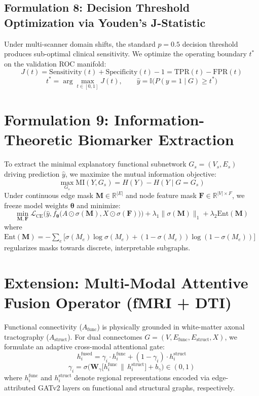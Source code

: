 \documentclass[11pt,a4paper]{article}
\begin{document}
\subsection{Formulation 8: Decision Threshold Optimization via Youden's J-Statistic}
Under multi-scanner domain shifts, the standard $p = 0.5$ decision threshold produces sub-optimal clinical sensitivity. We optimize the operating boundary $t^*$ on the validation ROC manifold:
\begin{equation}
J(t) = \text{Sensitivity}(t) + \text{Specificity}(t) - 1 = \text{TPR}(t) - \text{FPR}(t)
\end{equation}
\begin{equation}
t^* = \arg\max_{t \in [0, 1]} J(t), \qquad \hat{y} = \mathbb{I}\Big( P(y = 1 \mid G) \ge t^* \Big)
\end{equation}

\section{Formulation 9: Information-Theoretic Biomarker Extraction}
To extract the minimal explanatory functional subnetwork $G_s = (V_s, E_s)$ driving prediction $\hat{y}$, we maximize the mutual information objective:
\begin{equation}
\max_{G_s} \text{MI}(Y, G_s) = H(Y) - H(Y \mid G = G_s)
\end{equation}
Under continuous edge mask $\bm{M} \in \mathbb{R}^{|E|}$ and node feature mask $\bm{F} \in \mathbb{R}^{|V| \times F}$, we freeze model weights $\bm{\theta}$ and minimize:
\begin{equation}
\min_{\bm{M}, \bm{F}} \mathcal{L}_{\text{CE}}\Big( \hat{y}, f_{\bm{\theta}}\big( A \odot \sigma(\bm{M}), X \odot \sigma(\bm{F}) \big) \Big) + \lambda_1 \|\sigma(\bm{M})\|_1 + \lambda_2 \text{Ent}(\bm{M})
\end{equation}
where $\text{Ent}(\bm{M}) = -\sum_{e} \big[ \sigma(M_e) \log \sigma(M_e) + (1 - \sigma(M_e)) \log (1 - \sigma(M_e)) \big]$ regularizes masks towards discrete, interpretable subgraphs.

\section{Extension: Multi-Modal Attentive Fusion Operator (fMRI + DTI)}
Functional connectivity ($A_{\text{func}}$) is physically grounded in white-matter axonal tractography ($A_{\text{struct}}$). For dual connectomes $G = (V, E_{\text{func}}, E_{\text{struct}}, X)$, we formulate an adaptive cross-modal attentional gate:
\begin{equation}
h_i^{\text{fused}} = \gamma_i \cdot h_i^{\text{func}} + (1 - \gamma_i) \cdot h_i^{\text{struct}}
\end{equation}
\begin{equation}
\gamma_i = \sigma\Big( \bm{W}_\gamma \big[ h_i^{\text{func}} \,\|\, h_i^{\text{struct}} \big] + b_\gamma \Big) \in (0, 1)
\end{equation}
where $h_i^{\text{func}}$ and $h_i^{\text{struct}}$ denote regional representations encoded via edge-attributed GATv2 layers on functional and structural graphs, respectively.
\end{document}
